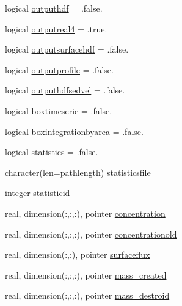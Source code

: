 \begin{DoxyCompactItemize}
\item 
logical \mbox{\hyperlink{structmodulewaterproperties_1_1t__property_ab8aee43c33ad01658f994783d984fa21}{outputhdf}} = .false.
\item 
logical \mbox{\hyperlink{structmodulewaterproperties_1_1t__property_ac947171281a6fa5bacacc42e18415aca}{outputreal4}} = .true.
\item 
logical \mbox{\hyperlink{structmodulewaterproperties_1_1t__property_a280c46984f7b0507bcc245b45837b25c}{outputsurfacehdf}} = .false.
\item 
logical \mbox{\hyperlink{structmodulewaterproperties_1_1t__property_a942d39dbb3faf142c06999dcdae3cfda}{outputprofile}} = .false.
\item 
logical \mbox{\hyperlink{structmodulewaterproperties_1_1t__property_a312ad799063228d11d2570d2f3e33e67}{outputhdfsedvel}} = .false.
\item 
logical \mbox{\hyperlink{structmodulewaterproperties_1_1t__property_ad1014012e544e556794ce94d340f74ca}{boxtimeserie}} = .false.
\item 
logical \mbox{\hyperlink{structmodulewaterproperties_1_1t__property_a57aee07fae212e60b9fd05ba1d1a89cb}{boxintegrationbyarea}} = .false.
\item 
logical \mbox{\hyperlink{structmodulewaterproperties_1_1t__property_a86092d953ea1621475a4167cbf81001c}{statistics}} = .false.
\item 
character(len=pathlength) \mbox{\hyperlink{structmodulewaterproperties_1_1t__property_a4bfbda6d444e221855c4628cd3637ecb}{statisticsfile}}
\item 
integer \mbox{\hyperlink{structmodulewaterproperties_1_1t__property_a35964ae86d70fc24dd5776d0f0b7f1f5}{statisticid}}
\item 
real, dimension(\+:,\+:,\+:), pointer \mbox{\hyperlink{structmodulewaterproperties_1_1t__property_a59c3a6bfd33121995621488a7804a82b}{concentration}}
\item 
real, dimension(\+:,\+:,\+:), pointer \mbox{\hyperlink{structmodulewaterproperties_1_1t__property_adc884ff83adcf516f377f2227cddf9fa}{concentrationold}}
\item 
real, dimension(\+:,\+:), pointer \mbox{\hyperlink{structmodulewaterproperties_1_1t__property_a1d3a0d6e00adc4711285a606ce27f4a7}{surfaceflux}}
\item 
real, dimension(\+:,\+:,\+:), pointer \mbox{\hyperlink{structmodulewaterproperties_1_1t__property_a7381ef122e72e28e678c2230f76b0923}{mass\+\_\+created}}
\item 
real, dimension(\+:,\+:,\+:), pointer \mbox{\hyperlink{structmodulewaterproperties_1_1t__property_a98248099342a82758bccf7455c33adc6}{mass\+\_\+destroid}}

\end{DoxyCompactItemize}

